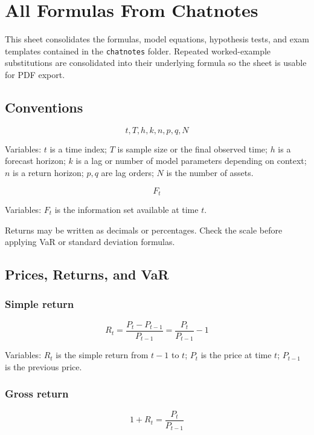 \documentclass[
  8pt,
  twocolumn]{extarticle}
\author{}
\date{}
\begin{document}
\section{All Formulas From Chatnotes}\label{all-formulas-from-chatnotes}

This sheet consolidates the formulas, model equations, hypothesis tests,
and exam templates contained in the \texttt{chatnotes} folder. Repeated
worked-example substitutions are consolidated into their underlying
formula so the sheet is usable for PDF export.

\subsection{Conventions}\label{conventions}

\[
t,T,h,k,n,p,q,N
\]

Variables: \(t\) is a time index; \(T\) is sample size or the final
observed time; \(h\) is a forecast horizon; \(k\) is a lag or number of
model parameters depending on context; \(n\) is a return horizon;
\(p,q\) are lag orders; \(N\) is the number of assets.

\[
F_t
\]

Variables: \(F_t\) is the information set available at time \(t\).

Returns may be written as decimals or percentages. Check the scale
before applying VaR or standard deviation formulas.

\subsection{Prices, Returns, and VaR}\label{prices-returns-and-var}

\subsubsection{Simple return}\label{simple-return}

\[
R_t=\frac{P_t-P_{t-1}}{P_{t-1}}=\frac{P_t}{P_{t-1}}-1
\]

Variables: \(R_t\) is the simple return from \(t-1\) to \(t\); \(P_t\)
is the price at time \(t\); \(P_{t-1}\) is the previous price.

\subsubsection{Gross return}\label{gross-return}

\[
1+R_t=\frac{P_t}{P_{t-1}}
\]
\end{document}
